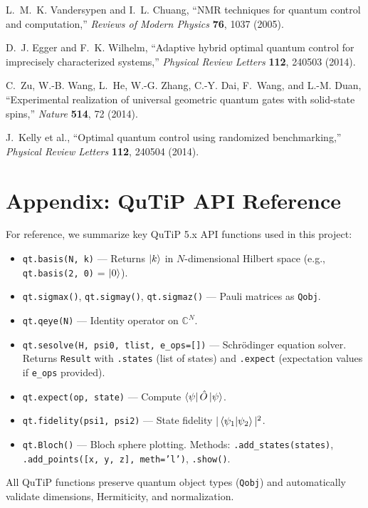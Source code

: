\documentclass[11pt,a4paper]{article}
\theoremstyle{definition}
\theoremstyle{remark}
\newcommand{\CC}{\mathbb{C}}
\begin{document}
\begin{enumerate}[label={[\arabic*]}]
    \item L.~M.~K. Vandersypen and I.~L. Chuang, ``NMR techniques for quantum control and computation,'' \emph{Reviews of Modern Physics} \textbf{76}, 1037 (2005).

    \item D.~J. Egger and F.~K. Wilhelm, ``Adaptive hybrid optimal quantum control for imprecisely characterized systems,'' \emph{Physical Review Letters} \textbf{112}, 240503 (2014).

    \item C.~Zu, W.-B. Wang, L.~He, W.-G. Zhang, C.-Y. Dai, F.~Wang, and L.-M. Duan, ``Experimental realization of universal geometric quantum gates with solid-state spins,'' \emph{Nature} \textbf{514}, 72 (2014).

    \item J.~Kelly et al., ``Optimal quantum control using randomized benchmarking,'' \emph{Physical Review Letters} \textbf{112}, 240504 (2014).
\end{enumerate}

\appendix
\section{Appendix: QuTiP API Reference}
\label{app:qutip}

For reference, we summarize key QuTiP 5.x API functions used in this project:

\begin{itemize}
    \item \texttt{qt.basis(N, k)} — Returns $\ket{k}$ in $N$-dimensional Hilbert space (e.g., \texttt{qt.basis(2, 0)} = $\ket{0}$).
    \item \texttt{qt.sigmax()}, \texttt{qt.sigmay()}, \texttt{qt.sigmaz()} — Pauli matrices as \texttt{Qobj}.
    \item \texttt{qt.qeye(N)} — Identity operator on $\CC^N$.
    \item \texttt{qt.sesolve(H, psi0, tlist, e\_ops=[])} — Schrödinger equation solver. Returns \texttt{Result} with \texttt{.states} (list of states) and \texttt{.expect} (expectation values if \texttt{e\_ops} provided).
    \item \texttt{qt.expect(op, state)} — Compute $\bra{\psi} \hat{O} \ket{\psi}$.
    \item \texttt{qt.fidelity(psi1, psi2)} — State fidelity $|\braket{\psi_1}{\psi_2}|^2$.
    \item \texttt{qt.Bloch()} — Bloch sphere plotting. Methods: \texttt{.add\_states(states)}, \texttt{.add\_points([x, y, z], meth='l')}, \texttt{.show()}.
\end{itemize}

All QuTiP functions preserve quantum object types (\texttt{Qobj}) and automatically validate dimensions, Hermiticity, and normalization.
\end{document}
